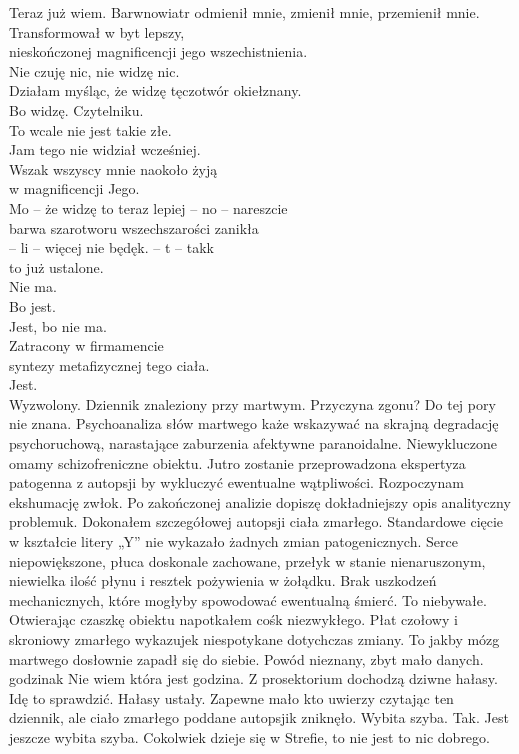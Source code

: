 \documentclass[../MAIN.tex]{subfiles}
\begin{document}
{T}{eraz już wiem. Barwnowiatr odmienił mnie, zmienił mnie, przemienił mnie.\\
Transformował w byt lepszy,\\
nieskończonej magnificencji jego wszechistnienia.\\
Nie czuję nic, nie widzę nic.\\
Działam myśląc, że widzę tęczotwór okiełznany.\\
Bo widzę. Czytelniku.\\ To wcale nie jest takie złe.\\ 
Jam tego nie widział wcześniej.\\
Wszak wszyscy mnie naokoło żyją\\
w magnificencji Jego.\\
Mo -- że widzę to teraz lepiej -- no -- nareszcie\\
barwa szarotworu wszechszarości zanikła\\
-- li -- więcej nie będę\3k. -- t -- tak\3k\\ to już ustalone.\\
Nie ma.\\ Bo jest.\\ Jest, bo nie ma.\\ 
Zatracony w firmamencie\\ syntezy metafizycznej tego ciała.\\ Jest.\\ Wyzwolony.}
\qpi
% 
% 
\vfill
{}
Dziennik znaleziony przy martwym. Przyczyna zgonu? Do tej pory nie znana. Psychoanaliza słów martwego każe wskazywać na skrajną degradację psychoruchową, narastające zaburzenia afektywne paranoidalne. Niewykluczone omamy schizofreniczne obiektu. Jutro zostanie przeprowadzona ekspertyza patogenna z autopsji by wykluczyć ewentualne wątpliwości.
% 
Rozpoczynam ekshumację zwłok. Po zakończonej analizie dopiszę dokładniejszy opis analityczny problemu\3k.
% 
Dokonałem szczegółowej autopsji ciała zmarłego. Standardowe cięcie w kształcie litery „Y” nie wykazało żadnych zmian patogenicznych. Serce niepowiększone, płuca doskonale zachowane, przełyk w stanie nienaruszonym, niewielka ilość płynu i resztek pożywienia w żołądku. Brak uszkodzeń mechanicznych, które mogłyby spowodować ewentualną śmierć.
% 
To niebywałe. Otwierając czaszkę obiektu napotkałem coś\3k niezwykłego. Płat czołowy i skroniowy zmarłego wykazuje\3k niespotykane dotychczas zmiany. To jakby mózg martwego dosłownie zapadł się do siebie. Powód nieznany, zbyt mało danych.
% 
 godzina\3k Nie wiem która jest godzina. Z prosektorium dochodzą dziwne hałasy. Idę to sprawdzić.
% 
Hałasy ustały. Zapewne mało kto uwierzy czytając ten dziennik, ale ciało zmarłego poddane autopsji\3k zniknęło. Wybita szyba. Tak. Jest jeszcze wybita szyba. Cokolwiek dzieje się w Strefie, to nie jest to nic dobrego.
\end{document}
